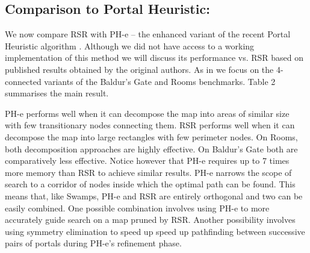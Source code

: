 \subsection{Comparison to Portal Heuristic:}
We now compare RSR with PH-e -- the enhanced variant of the recent 
Portal Heuristic algorithm \citep{goldenberg10}.
Although we did not have access to a working implementation of this method we
will discuss its performance vs. RSR based on published results obtained by the
original authors. As in \citep{goldenberg10} we focus on the 4-connected variants 
of the Baldur's Gate and Rooms benchmarks.
Table 2 summarises the main result.
\par
PH-e performs well when it can decompose the map into areas of similar size with
few transitionary nodes connecting them.
RSR performs well when it can decompose the map into large rectangles with few
perimeter nodes.
On Rooms, both decomposition approaches are highly effective. 
On Baldur's Gate both are comparatively less effective.
Notice however that PH-e requires up to 7 times more memory than RSR to achieve
similar results.
PH-e narrows the scope of search to a corridor of nodes inside which the
optimal path can be found. This means that, like Swamps, PH-e and RSR
are entirely orthogonal and two can be easily combined. 
One possible combination involves using PH-e to more accurately guide search
on a map pruned by RSR. Another possibility involves using symmetry
elimination to speed up speed up pathfinding between successive pairs of
portals during PH-e's refinement phase.
